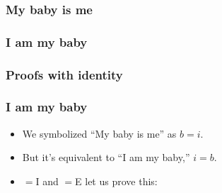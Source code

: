 \begin{frame}
  \frametitle{My baby is me}

  \begin{fitchproof}
\end{fitchproof}
\end{frame}

\begin{frame}
  \frametitle{I am my baby}

  \begin{fitchproof}
\end{fitchproof}
\end{frame}

\begin{frame}
  \frametitle{Proofs with identity}
  
  \begin{fitchproof}
     
  \end{fitchproof}
  
  \begin{fitchproof}
     
  \end{fitchproof}
  \begin{fitchproof}
     
  \end{fitchproof}
\end{frame}

\begin{frame}
  \frametitle{I am my baby}

  \begin{itemize}
    \item We symbolized ``My baby is me'' as $b = i$.
    \item But it's equivalent to ``I am my baby,'' $i = b$.
    \item $=$I and $=$E let us prove this:
    \begin{fitchproof}
    \end{fitchproof}
  \end{itemize}
\end{frame}

